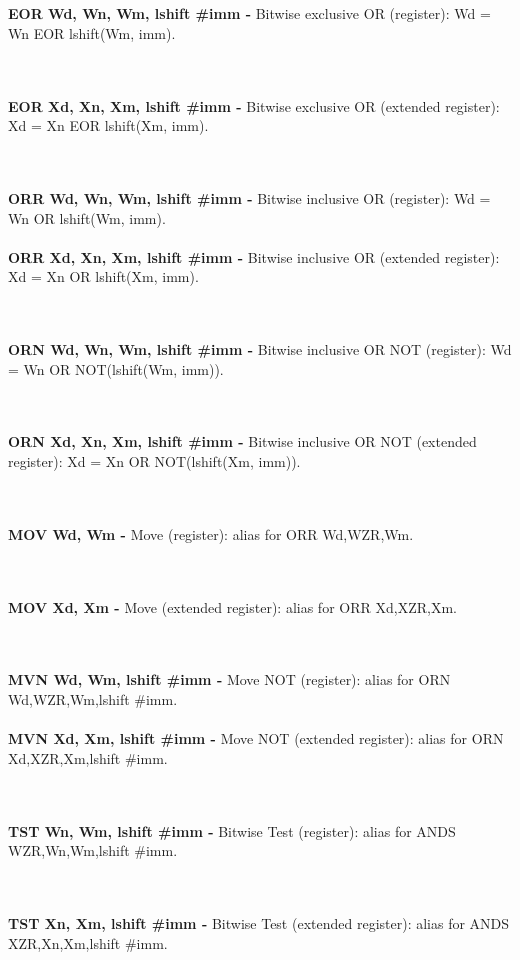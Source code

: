 \documentclass[12pt,a4paper,utf8]{ppgsi}
\begin{document}
\\\\\textbf{EOR Wd, Wn, Wm{, lshift #imm} -} Bitwise exclusive OR (register): Wd = Wn EOR lshift(Wm, imm). 

\\\\\textbf{EOR Xd, Xn, Xm{, lshift #imm} -} Bitwise exclusive OR (extended register): Xd = Xn EOR lshift(Xm, imm). 

\\\\\textbf{ORR Wd, Wn, Wm{, lshift #imm} -} Bitwise inclusive OR (register): Wd = Wn OR lshift(Wm, imm). 
\\\\\textbf{ORR Xd, Xn, Xm{, lshift #imm} -} Bitwise inclusive OR (extended register): Xd = Xn OR lshift(Xm, imm). 

\\\\\textbf{ORN Wd, Wn, Wm{, lshift #imm} -} Bitwise inclusive OR NOT (register): Wd = Wn OR NOT(lshift(Wm, imm)). 

\\\\\textbf{ORN Xd, Xn, Xm{, lshift #imm} -} Bitwise inclusive OR NOT (extended register): Xd = Xn OR NOT(lshift(Xm, imm)). 

\\\\\textbf{MOV Wd, Wm -} Move (register): alias for ORR Wd,WZR,Wm. 

\\\\\textbf{MOV Xd, Xm -} Move (extended register): alias for ORR Xd,XZR,Xm. 

\\\\\textbf{MVN Wd, Wm{, lshift #imm} -} Move NOT (register): alias for ORN Wd,WZR,Wm{,lshift #imm}. 
\\\\\textbf{MVN Xd, Xm{, lshift #imm} -} Move NOT (extended register): alias for ORN Xd,XZR,Xm{,lshift #imm}. 

\\\\\textbf{TST Wn, Wm{, lshift #imm} -} Bitwise Test (register): alias for ANDS WZR,Wn,Wm{,lshift #imm}. 

\\\\\textbf{TST Xn, Xm{, lshift #imm} -} Bitwise Test (extended register): alias for ANDS XZR,Xn,Xm{,lshift #imm}. 
\end{document}
